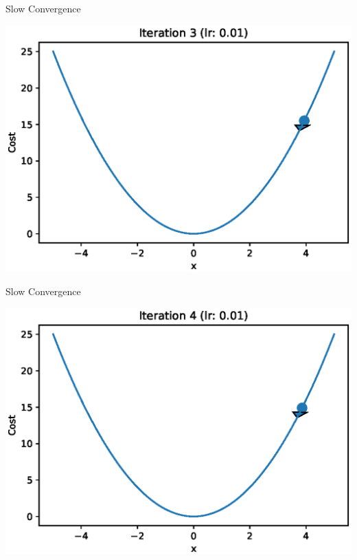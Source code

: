 \documentclass{beamer}
\begin{document}
	\begin{frame}{Slow Convergence}
		\begin{center}
			\includegraphics[totalheight=6cm]{gradient-descent/undershooting-3.eps}
		\end{center}
	\end{frame}
	
	\begin{frame}{Slow Convergence}
		\begin{center}
			\includegraphics[totalheight=6cm]{gradient-descent/undershooting-4.eps}
		\end{center}
	\end{frame}
	
\end{document}
